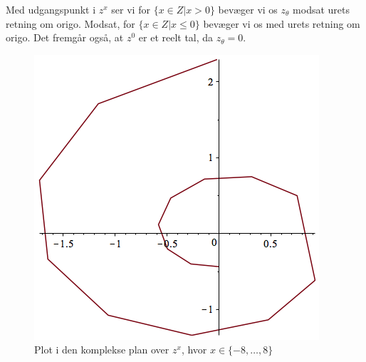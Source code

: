 \documentclass[11pt,a4paper]{article}
\begin{document}
\begin{multicols}{2}

Med udgangspunkt i $z^x$ ser vi for $\{x \in Z | x > 0\}$ bevæger vi
os $z_\theta$ modsat urets retning om origo. Modsat, for $\{x \in Z | x \leq
0\}$ bevæger vi os med urets retning om origo. Det fremgår også, at $z^0$ er
et reelt tal, da $z_\theta = 0$.

\vfill\columnbreak

\begin{figure}[H]
    \includegraphics[scale=0.5]{figures/fib.png}
    \caption{Plot i den komplekse plan over $z^x$, hvor $x \in \{-8,\dots,8\}$}
\end{figure}

\end{multicols}
\end{document}
